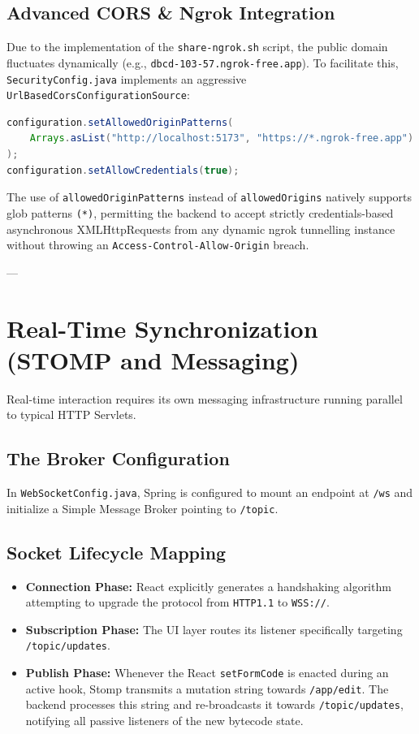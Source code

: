 \documentclass[12pt,a4paper]{article}
\begin{document}
\subsection{Advanced CORS \& Ngrok Integration}
Due to the implementation of the \texttt{share-ngrok.sh} script, the public domain fluctuates dynamically (e.g., \texttt{dbcd-103-57.ngrok-free.app}). 
To facilitate this, \texttt{SecurityConfig.java} implements an aggressive \texttt{UrlBasedCorsConfigurationSource}:
\begin{lstlisting}[language=java]
configuration.setAllowedOriginPatterns(
    Arrays.asList("http://localhost:5173", "https://*.ngrok-free.app")
);
configuration.setAllowCredentials(true);
\end{lstlisting}
The use of \texttt{allowedOriginPatterns} instead of \texttt{allowedOrigins} natively supports glob patterns \texttt{(*)}, permitting the backend to accept strictly credentials-based asynchronous XMLHttpRequests from any dynamic ngrok tunnelling instance without throwing an \texttt{Access-Control-Allow-Origin} breach.

---

\section{Real-Time Synchronization (STOMP and Messaging)}
Real-time interaction requires its own messaging infrastructure running parallel to typical HTTP Servlets.

\subsection{The Broker Configuration}
In \texttt{WebSocketConfig.java}, Spring is configured to mount an endpoint at \texttt{/ws} and initialize a Simple Message Broker pointing to \texttt{/topic}. 

\subsection{Socket Lifecycle Mapping}
\begin{itemize}
    \item \textbf{Connection Phase:} React explicitly generates a handshaking algorithm attempting to upgrade the protocol from \texttt{HTTP1.1} to \texttt{WSS://}.
    \item \textbf{Subscription Phase:} The UI layer routes its listener specifically targeting \texttt{/topic/updates}.
    \item \textbf{Publish Phase:} Whenever the React \texttt{setFormCode} is enacted during an active hook, Stomp transmits a mutation string towards \texttt{/app/edit}. The backend processes this string and re-broadcasts it towards \texttt{/topic/updates}, notifying all passive listeners of the new bytecode state.
\end{itemize}
\end{document}
